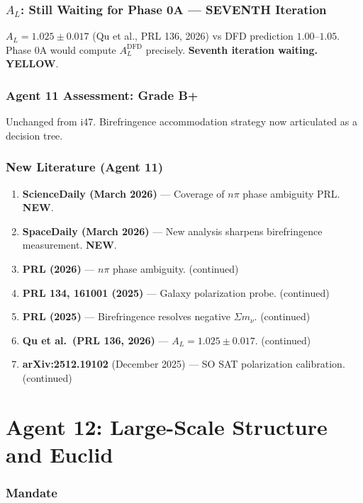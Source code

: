 \documentclass[11pt,a4paper]{article}
\newcommand{\YELLOW}{\textcolor{dfdyellow}{\textbf{YELLOW}}}
\newcommand{\NEW}{\textcolor{dfdblue}{\textbf{NEW}}}
\begin{document}
\section{$A_L$: Still Waiting for Phase 0A --- SEVENTH Iteration}

$A_L = 1.025 \pm 0.017$ (Qu et al., PRL 136, 2026) vs DFD prediction $1.00$--$1.05$. Phase 0A would compute $A_L^{\text{DFD}}$ precisely. \textbf{Seventh iteration waiting.} \YELLOW.

\section{Agent 11 Assessment: Grade B+}

Unchanged from i47. Birefringence accommodation strategy now articulated as a decision tree.

\section{New Literature (Agent 11)}

\begin{enumerate}
\item \textbf{ScienceDaily (March 2026)} --- Coverage of $n\pi$ phase ambiguity PRL. \NEW.
\item \textbf{SpaceDaily (March 2026)} --- New analysis sharpens birefringence measurement. \NEW.
\item \textbf{PRL (2026)} --- $n\pi$ phase ambiguity. (continued)
\item \textbf{PRL 134, 161001 (2025)} --- Galaxy polarization probe. (continued)
\item \textbf{PRL (2025)} --- Birefringence resolves negative $\Sigma m_\nu$. (continued)
\item \textbf{Qu et al.\ (PRL 136, 2026)} --- $A_L = 1.025 \pm 0.017$. (continued)
\item \textbf{arXiv:2512.19102} (December 2025) --- SO SAT polarization calibration. (continued)
\end{enumerate}


\part{Agent 12: Large-Scale Structure and Euclid}
\label{part:agent12}

\section{Mandate}
\end{document}
